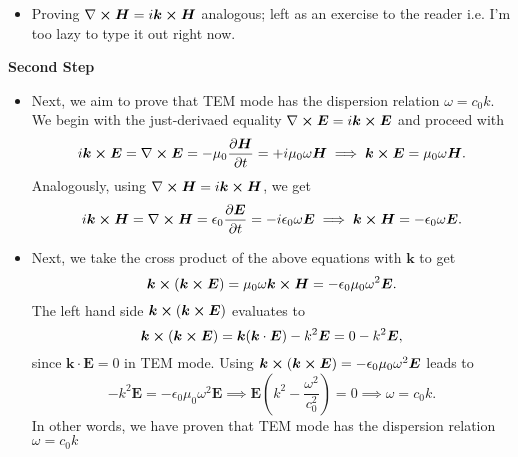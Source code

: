 \documentclass[11pt, a4paper]{article}
\renewcommand{\vec}[1]{\bm{#1}} %
\newcommand{\E}{\vec{E}}  %
\renewcommand{\H}{\vec{H}}  %
\newcommand{\ee}{\epsilon_{0}}  %
\newcommand{\mm}{\mu_{0}}  %
\newcommand{\m}{\vec{m}}  %
\renewcommand{\curl}{\nabla \cross}
\begin{document}
\begin{itemize}
	\item Proving $ \curl \H = i \vec{k} \cross \H $ analogous; left as an exercise to the reader i.e. I'm too lazy to type it out right now.
\end{itemize}
	
\textbf{Second Step}
\begin{itemize}
	\item Next, we aim to prove that TEM mode has the dispersion relation $  \omega = c_{0}k $. We begin with the just-derivaed equality $ \curl \E = i \vec{k} \cross \E $ and proceed with
	\begin{equation*}
		i\vec{k} \cross \E  = \curl \E = - \mm \pdv{\H}{t} = + i\mm \omega \H \implies \vec{k} \cross \E =  \mm \omega \H.
	\end{equation*}
    Analogously, using $ \curl \H = i \vec{k} \cross \H  $, we get
	\begin{equation*}
		i\vec{k} \cross \H  = \curl \H = \ee \pdv{\E}{t} = - i \ee \omega \E \implies \vec{k} \cross \H =  - \ee \omega \E.
	\end{equation*}
	
    \item Next, we take the cross product of the above equations with $ \vec{k} $ to get
	\begin{equation*}
		\vec{k} \cross (\vec{k} \cross \E) = \mm \omega \vec{k} \cross \H = - \ee \mm \omega^{2} \E.
	\end{equation*}
    The left hand side $ \vec{k} \cross ( \vec{k} \cross \E) $ evaluates to
	\begin{equation*}
		\vec{k} \cross (\vec{k} \cross \E) = \vec{k}(\vec{k} \cdot \E) - k^{2}\E = 0 - k^{2}\E,
	\end{equation*}
	since $ \vec{k} \cdot \E = 0 $ in TEM mode. Using $ \vec{k} \cross (\vec{k} \cross \E) = - \ee \mm \omega^{2} \E $ leads to
	\begin{equation*}
        -k^{2}\E = - \ee \mm \omega^{2}\E \implies \E\left(k^{2} - \frac{\omega^{2}}{c_{0}^{2}}\right) = 0 \implies \omega = c_{0}k.
	\end{equation*}
    In other words, we have proven that TEM mode has the dispersion relation $ \omega = c_{0}k $
\end{itemize}
\end{document}
